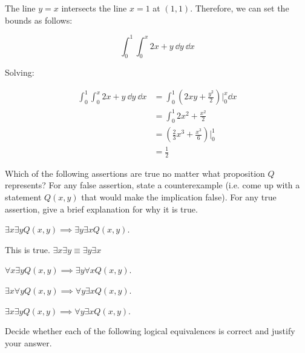 \documentclass[11pt]{article}
\begin{document}
\begin{Parts}
    \begin{solution}
    The line $y = x$ intersects the line $x = 1$ at $(1, 1)$. Therefore, we can set the bounds as follows: 

    \[ \int_0^1\int_0^x 2x + y \ \dd y \ \dd x\]

    Solving: 

    \begin{align*}
        \int_0^1\int_0^x 2x + y \ \dd y \ \dd x &= \int_0^1 (2xy + \frac{y^2}{2})\bigg\rvert_0^x \dd x\\
        &= \int_0^1 2x^2 + \frac{x^2}{2}\\
        &= \left(\frac{2}{3}x^3 + \frac{x^3}{6}\right)\bigg\rvert_0^1\\
        &= \frac{1}{2}
    \end{align*}

    \end{solution}
\end{Parts}

Which of the following assertions are true no matter what proposition $Q$ represents? For any false assertion, state a counterexample (i.e. come up with a statement $Q(x, y)$ that would make the implication false). For any true assertion, give a brief explanation for why it is true.

\begin{Parts}

\item
$\exists x \exists y Q(x,y) \implies \exists y \exists x Q(x,y)$.

\begin{solution}
    This is true. $\exists x \exists y \equiv \exists y \exists x$
\end{solution}
    

\item
$\forall x \exists y Q(x,y) \implies \exists y\forall x Q(x,y)$.
    

\item
$\exists x \forall y Q(x,y) \implies \forall y \exists x Q(x,y)$.
    

\item
$\exists x \exists y Q(x,y) \implies \forall y \exists x Q(x,y)$.
    

\end{Parts}


Decide whether each of the following logical equivalences is correct and justify your answer. 
\end{document}
